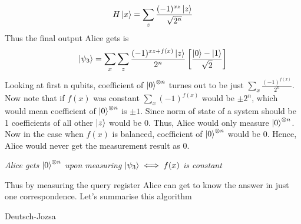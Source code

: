\begin{equation}
    H\ket{x} = \sum_z \frac{(-1)^{xz}\ket{z}}{\sqrt{2^n}}
\end{equation}
Thus the final output Alice gets is
\begin{equation}
    \ket{\psi_3} = \sum_x \sum_z \frac{(-1)^{xz+f(x)}\ket{z}}{2^n}\left[ \frac{\ket{0}-\ket{1}}{\sqrt{2}} \right]
\end{equation}
Looking at first n qubits, coefficient of $\ket{0}^{\otimes n}$ turnes out to be just $\sum_x \frac{(-1)^{f(x)}}{2^n}$. Now note that if $f(x)$ was constant $\sum_x(-1)^{f(x)}$ would be $\pm 2^n$, which would mean coefficient of $\ket{0}^{\otimes n}$ is $\pm1$. Since norm of state of a system should be 1 coefficients of all other $\ket{z}$ would be 0. Thus, Alice would only measure $\ket{0}^{\otimes n}$. Now in the case when $f(x)$ is balanced, coefficient of $\ket{0}^{\otimes n}$ would be 0. Hence, Alice would never get the measurement result as 0.
\begin{center}
    \textit{
    Alice gets $\ket{0}^{\otimes n}$ upon measuring $\ket{\psi_3} \iff f(x)$ is constant
    }
\end{center}
Thus by measuring the query register Alice can get to know the answer in just one correspondence. Let's summarise this algorithm

\begin{algorithm}[H]
    \SetAlgoLined\DontPrintSemicolon
    \caption{Deutsch-Jozsa}

\end{algorithm}

